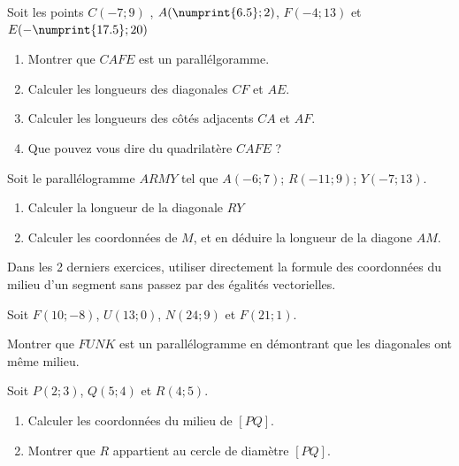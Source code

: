 \begin{exercise}\label{chapter06:exercice:naturequadrilatere02} Soit les points $C(-7;9)$ , $A(\numprint{6.5};2)$, $F(-4;13)$ et $E(-\numprint{17.5};20)$
	\begin{enumerate}[label=\alph*), leftmargin=*]
		\item Montrer que $CAFE$ est un parallélgoramme.
		\item Calculer les longueurs des diagonales $CF$ et $AE$.
		\item Calculer les longueurs des côtés adjacents $CA$ et $AF$.
		\item  Que pouvez vous dire du quadrilatère $CAFE$ ?
	\end{enumerate}
\end{exercise} 
\begin{exercise} Soit le parallélogramme $ARMY$ tel que $A(-6;7)$; $R(-11;9)$; $Y(-7;13)$.\hfill 
	\begin{enumerate}[label=\alph*), leftmargin=*]
		\item Calculer la longueur de la diagonale $RY$  
		\item Calculer les coordonnées de $M$, et en déduire la longueur de la diagone $AM$.
	\end{enumerate}
\end{exercise} 
\begin{eBox}
	Dans les 2 derniers exercices, utiliser directement la formule des coordonnées du milieu d'un segment sans passez par des égalités vectorielles.
\end{eBox} 
\begin{exercise}  Soit $F(10;−8)$, $U(13;0)$, $N(24;9)$ et $F(21;1)$.
	
	Montrer que $FUNK$ est un parallélogramme en démontrant que les diagonales ont même milieu. 
\end{exercise}
\begin{exercise} 	Soit $P(2;3)$, $Q(5;4)$ et $R(4;5)$. 
	\begin{enumerate}[label=\alph*)]
		\item Calculer les coordonnées du milieu de $[PQ]$.
		\item Montrer que $R$ appartient au cercle de diamètre $[PQ]$.
	\end{enumerate} 
\end{exercise}  

